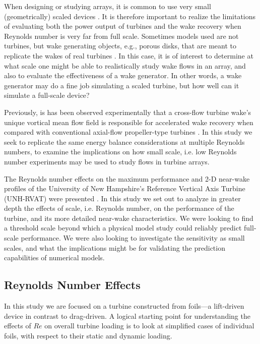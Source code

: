 \documentclass[energies,article,accept,moreauthors,pdftex,12pt,a4paper]{mdpi}
\begin{document}
When designing or studying arrays, it is common to use very small
(geometrically) scaled devices \cite{Chamorro2011, Chamorro2011b}. It is
therefore important to realize the limitations of evaluating both the power
output of turbines and the wake recovery when Reynolds number is very far from
full scale. Sometimes models used are not turbines, but wake generating objects,
e.g., porous disks, that are meant to replicate the wakes of real turbines
\cite{Goldenberg1983}. In this case, it is of interest to determine at what
scale one might be able to realistically study wake flows in an array, and also
to evaluate the effectiveness of a wake generator. In other words, a wake
generator may do a fine job simulating a scaled turbine, but how well can it
simulate a full-scale device?

Previously, is has been observed experimentally that a cross-flow turbine wake's
unique vortical mean flow field is responsible for accelerated wake recovery
when compared with conventional axial-flow propeller-type turbines
\cite{Bachant2015-JoT}. In this study we seek to replicate the same energy
balance considerations at multiple Reynolds numbers, to examine the implications
on how small scale, i.e. low Reynolds number experiments may be used to study
flows in turbine arrays.

The Reynolds number effects on the maximum performance and 2-D near-wake
profiles of the University of New Hampshire's Reference Vertical Axis Turbine
(UNH-RVAT) were presented \cite{Bachant2014}. In this study we set out to
analyze in greater depth the effects of scale, i.e. Reynolds number, on the
performance of the turbine, and its more detailed near-wake characteristics. We
were looking to find a threshold scale beyond which a physical model study could
reliably predict full-scale performance. We were also looking to investigate the
sensitivity as small scales, and what the implications might be for validating
the prediction capabilities of numerical models.


\subsection{Reynolds Number Effects}

In this study we are focused on a turbine constructed from foils---a lift-driven
device in contrast to drag-driven. A logical starting point for understanding
the effects of $Re$ on overall turbine loading is to look at simplified cases
of individual foils, with respect to their static and dynamic loading. 
\end{document}
